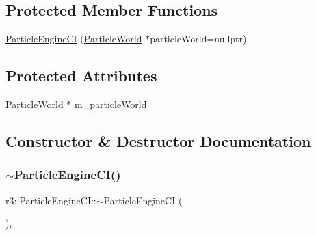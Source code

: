 \subsection*{Protected Member Functions}
\begin{DoxyCompactItemize}
\item 
\mbox{\hyperlink{classr3_1_1_particle_engine_c_i_aed45db6981645c4b1f4b8660e86ef7cc}{Particle\+Engine\+CI}} (\mbox{\hyperlink{classr3_1_1_particle_world}{Particle\+World}} $\ast$particle\+World=nullptr)
\end{DoxyCompactItemize}
\subsection*{Protected Attributes}
\begin{DoxyCompactItemize}
\item 
\mbox{\hyperlink{classr3_1_1_particle_world}{Particle\+World}} $\ast$ \mbox{\hyperlink{classr3_1_1_particle_engine_c_i_ad13321df475d526a7a2ed34e46cc10ee}{m\+\_\+particle\+World}}
\end{DoxyCompactItemize}


\subsection{Constructor \& Destructor Documentation}
\mbox{\label{classr3_1_1_particle_engine_c_i_ab94f2e07fe82865bdf3845db7c47df0d}} 
\subsubsection{\texorpdfstring{$\sim$\+Particle\+Engine\+C\+I()}{~ParticleEngineCI()}}
{\footnotesize\ttfamily r3\+::\+Particle\+Engine\+C\+I\+::$\sim$\+Particle\+Engine\+CI (\begin{DoxyParamCaption}{ }\end{DoxyParamCaption})\hspace{0.3cm}{\ttfamily [virtual]}, {\ttfamily [default]}}

\mbox{\label{classr3_1_1_particle_engine_c_i_aed45db6981645c4b1f4b8660e86ef7cc}} 
